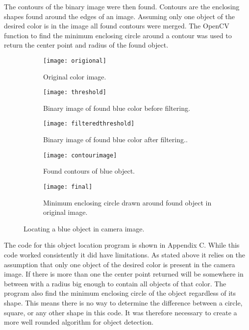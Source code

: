 The contours of the binary image were then found. Contours are the enclosing shapes found around the edges of an image. Assuming only one object of the desired color is in the image all found contours were merged. The OpenCV function to find the minimum enclosing circle around a contour was used to return the center point and radius of the found object. 

\begin{figure}
    \centering
    \begin{subfigure}[b]{0.3\textwidth}
    	\texttt{[image: origional]}
    	\caption{Original color image. }
    	\label{fig:image1}
   	 \end{subfigure}
   	 \quad
    \begin{subfigure}[b]{0.3\textwidth}
		\texttt{[image: threshold]}
		\caption{Binary image of found blue color before filtering. }
		\label{fig:image2}
    \end{subfigure}
    \quad %
    \begin{subfigure}[b]{0.3\textwidth}
        \texttt{[image: filteredthreshold]}
        \caption{Binary image of found blue color after filtering.. }
        \label{fig:image3}
    \end{subfigure}
    \quad
    \begin{subfigure}[b]{0.3\textwidth}
       	\texttt{[image: contourimage]}
       	\caption{Found contours of blue object. }
       	\label{fig:image4}
   \end{subfigure}
    \quad
    \begin{subfigure}[b]{0.3\textwidth}
        \texttt{[image: final]}
        \caption{Minimum enclosing circle drawn around found object in original image. }
        \label{fig:image5}
    \end{subfigure}
    \quad
 	\caption{Locating a blue object in camera image. }
 	\label{fig:imag}
\end{figure}


The code for this object location program is shown in Appendix C. While this code worked consistently it did have limitations. As stated above it relies on the assumption that only one object of the desired color is present in the camera image. If there is more than one the center point returned will be somewhere in between with a radius big enough to contain all objects of that color. The program also find the minimum enclosing circle of the object regardless of its shape. This means there is no way to determine the difference between a circle, square, or any other shape in this code. It was therefore necessary to create a more well rounded algorithm for object detection.

